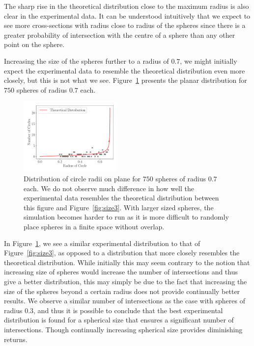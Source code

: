 \documentclass[journal]{IEEEtran}
\begin{document}
The sharp rise in the theoretical distribution close to the maximum radius is
also clear in the experimental data. It can be understood intuitively that we
expect to see more cross-sections with radius close to radius of the spheres
since there is a greater probability of intersection with the centre of a sphere
than any other point on the sphere.

Increasing the size of the spheres further to a radius of $0.7$, we might
initially expect the experimental data to resemble the theoretical distribution
even more closely, but this is not what we see. Figure~\ref{fig:size7} presents
the planar distribution for $750$ spheres of radius $0.7$ each.

\begin{figure}%
\begin{center}
\includegraphics[width=0.45\textwidth]{./../Figures/750_07.pdf}
\caption{Distribution of circle radii on plane for $750$ spheres of radius $0.7$
  each. We do not observe much difference in how well the experimental data
  resembles the theoretical distribution between this figure and
  Figure~\ref{fig:size3}. With larger sized spheres, the simulation becomes harder
  to run as it is more difficult to randomly place spheres in a finite space
  without overlap.}\label{fig:size7}
\end{center}
\end{figure}

In Figure~\ref{fig:size7}, we see a similar experimental distribution to that of
Figure~\ref{fig:size3}, as opposed to a distribution that more closely resembles
the theoretical distribution. While initially this may seem contrary to the
notion that increasing size of spheres would increase the number of
intersections and thus give a better distribution, this may simply be due to the
fact that increasing the size of the spheres beyond a certain radius does not
provide continually better results. We observe a similar number of intersections
as the case with spheres of radius $0.3$, and thus it is possible to conclude
that the best experimental distribution is found for a spherical size that
ensures a significant number of intersections. Though continually increasing
spherical size provides diminishing returns.
\end{document}
